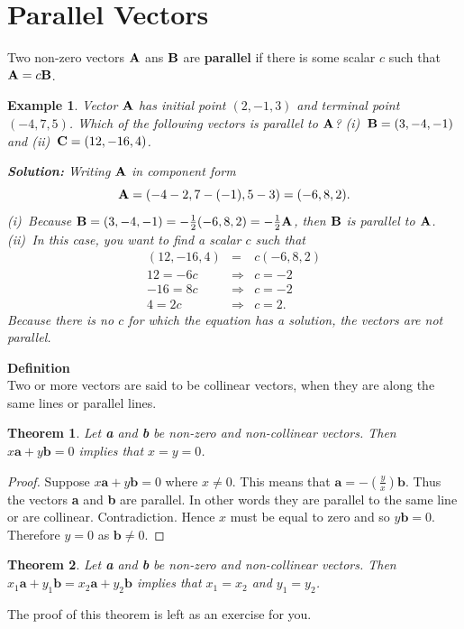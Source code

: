 \documentclass[titlepage,a4paper,12pt]{report}
\newtheorem{example}{Example}[section]
\newtheorem{theorem}{Theorem}[section]
\begin{document}
\section{Parallel Vectors}
Two non-zero vectors ${\bf{A}}$ ans ${\bf{B}}$ are \textbf{parallel} if there is some scalar $c$ such that ${\bf{A}}=c{\bf{B}}$.
\begin{example}
Vector ${\bf{A}}$ has initial point $(2,-1,3)$ and terminal point $(-4,7,5)$. Which of the following vectors is parallel to ${\bf{A}}$? (i)\, ${\bf{B}}=(3,-4,-1)$ and (ii)\, ${\bf{C}}=(12,-16,4)$.

\noindent \textbf{Solution:} Writing ${\bf{A}}$ in component form
\[{\bf{A}}=(-4-2, 7-(-1), 5-3)=(-6,8,2).\]
(i)\, Because ${\bf{B}}=(3,-4,-1)=-\frac{1}{2}(-6,8,2)=-\frac{1}{2}{\bf{A}}$, then ${\bf{B}}$ is parallel to ${\bf{A}}$.\\
(ii)\, In this  case, you want to find a scalar $c$ such that 
\begin{eqnarray*}
(12,-16,4) &=& c(-6,8,2)\\
12=-6c & \Rightarrow & c=-2 \\
-16 =8c & \Rightarrow & c=-2 \\
4=2c & \Rightarrow & c=2.
\end{eqnarray*}
Because there is no $c$ for which the equation has a solution, the vectors are not parallel.
\end{example}
\noindent \textbf{Definition}\\
Two or more vectors are said to be collinear vectors, when they are along the same lines or parallel lines.\\
\begin{theorem}
Let \textbf{a} and \textbf{b} be non-zero and non-collinear vectors. Then $x\textbf{a}+y\textbf{b}=0$ implies that $x=y=0$.
\end{theorem}
\begin{proof}
Suppose $x\textbf{a}+y\textbf{b}=0$ where $x\neq 0$. This means that $\textbf{a}=-(\frac{y}{x})\textbf{b}$. Thus the vectors \textbf{a} and \textbf{b} are parallel. In other words they are parallel to the same line or are collinear. Contradiction. Hence $x$ must be equal to zero and so $y\textbf{b}=0$. Therefore $y=0$ as $\textbf{b}\neq 0$.
\end{proof}
\begin{theorem}
Let \textbf{a} and \textbf{b} be non-zero and non-collinear vectors. Then $x_1\textbf{a}+y_1\textbf{b}=x_2\textbf{a}+y_2\textbf{b}$ implies that $x_1=x_2$ and $y_1=y_2$.
\end{theorem}
\noindent The proof of this theorem is left as an exercise for you.
\end{document}
